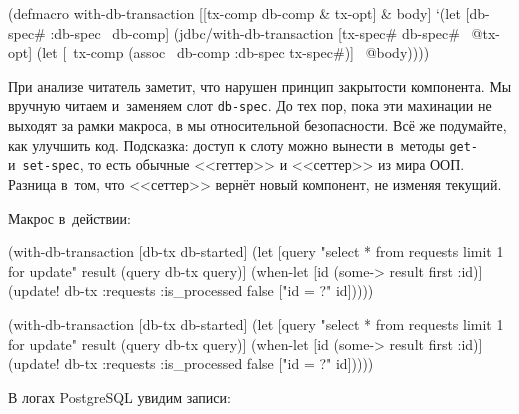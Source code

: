 \else

\begin{english}
  \begin{clojure}
(defmacro with-db-transaction
  [[tx-comp db-comp & tx-opt] & body]
  `(let [{db-spec# :db-spec} ~db-comp]
     (jdbc/with-db-transaction
       [tx-spec# db-spec# ~@tx-opt]
       (let [~tx-comp (assoc ~db-comp :db-spec tx-spec#)]
         ~@body))))
  \end{clojure}
\end{english}

\fi


При анализе читатель заметит, что нарушен принцип закрытости компонента. Мы
вручную читаем и~заменяем слот \verb|db-spec|. До тех пор, пока эти махинации не
выходят за рамки макроса, в мы относительной безопасности. Всё же подумайте, как
улучшить код. Подсказка: доступ к слоту можно вынести в~методы \verb|get-|
и~\verb|set-spec|, то есть обычные <<геттер>> и <<сеттер>> из мира ООП. Разница
в~том, что <<сеттер>> вернёт новый компонент, не изменяя текущий.

Макрос в~действии:

\ifnarrow

\begin{english}
  \begin{clojure}
(with-db-transaction
  [db-tx db-started]
  (let [query "select * from requests
               limit 1 for update"
        result (query db-tx query)]
    (when-let [id (some->
                    result first :id)]
      (update! db-tx :requests
               {:is_processed false}
               ["id = ?" id]))))
  \end{clojure}
\end{english}

\else

\begin{english}
  \begin{clojure}
(with-db-transaction
  [db-tx db-started]
  (let [query "select * from requests limit 1 for update"
        result (query db-tx query)]
    (when-let [id (some-> result first :id)]
      (update! db-tx :requests
               {:is_processed false}
               ["id = ?" id]))))
  \end{clojure}
\end{english}

\fi

\noindent
В логах PostgreSQL увидим записи:


